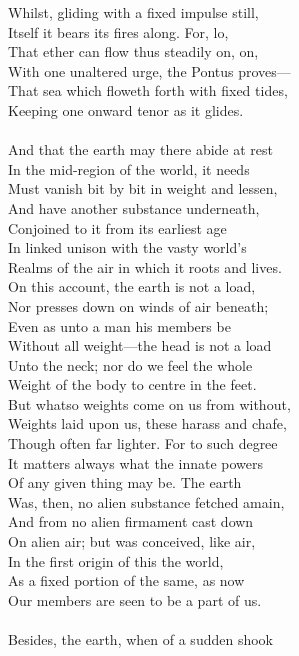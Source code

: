 Whilst, gliding with a fixed impulse still,\\
Itself it bears its fires along. For, lo,\\
That ether can flow thus steadily on, on,\\
With one unaltered urge, the Pontus proves—\\
That sea which floweth forth with fixed tides,\\
Keeping one onward tenor as it glides.\\
\\
And that the earth may there abide at rest\\
In the mid-region of the world, it needs\\
Must vanish bit by bit in weight and lessen,\\
And have another substance underneath,\\
Conjoined to it from its earliest age\\
In linked unison with the vasty world's\\
Realms of the air in which it roots and lives.\\
On this account, the earth is not a load,\\
Nor presses down on winds of air beneath;\\
Even as unto a man his members be\\
Without all weight—the head is not a load\\
Unto the neck; nor do we feel the whole\\
Weight of the body to centre in the feet.\\
But whatso weights come on us from without,\\
Weights laid upon us, these harass and chafe,\\
Though often far lighter. For to such degree\\
It matters always what the innate powers\\
Of any given thing may be. The earth\\
Was, then, no alien substance fetched amain,\\
And from no alien firmament cast down\\
On alien air; but was conceived, like air,\\
In the first origin of this the world,\\
As a fixed portion of the same, as now\\
Our members are seen to be a part of us.\\
\\
Besides, the earth, when of a sudden shook\\
